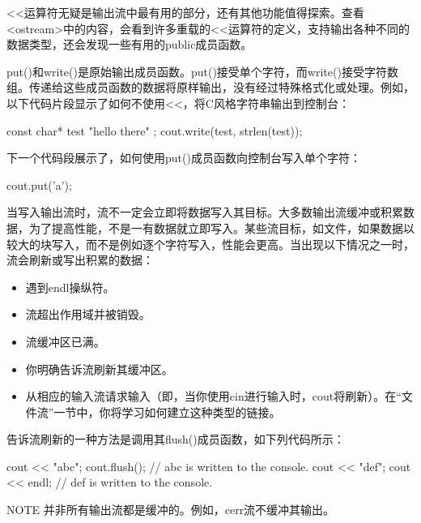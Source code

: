 
<{}<运算符无疑是输出流中最有用的部分，还有其他功能值得探索。查看<ostream>中的内容，会看到许多重载的<{}<运算符的定义，支持输出各种不同的数据类型，还会发现一些有用的public成员函数。


put()和write()是原始输出成员函数。put()接受单个字符，而write()接受字符数组。传递给这些成员函数的数据将原样输出，没有经过特殊格式化或处理。例如，以下代码片段显示了如何不使用<{}<，将C风格字符串输出到控制台：

\begin{cpp}
const char* test { "hello there" };
cout.write(test, strlen(test));
\end{cpp}

下一个代码段展示了，如何使用put()成员函数向控制台写入单个字符：

\begin{cpp}
cout.put('a');
\end{cpp}


当写入输出流时，流不一定会立即将数据写入其目标。大多数输出流缓冲或积累数据，为了提高性能，不是一有数据就立即写入。某些流目标，如文件，如果数据以较大的块写入，而不是例如逐个字符写入，性能会更高。当出现以下情况之一时，流会刷新或写出积累的数据：

\begin{itemize}
\item
遇到endl操纵符。

\item
流超出作用域并被销毁。

\item
流缓冲区已满。

\item
你明确告诉流刷新其缓冲区。

\item
从相应的输入流请求输入（即，当你使用cin进行输入时，cout将刷新）。在“文件流”一节中，你将学习如何建立这种类型的链接。
\end{itemize}

告诉流刷新的一种方法是调用其flush()成员函数，如下列代码所示：

\begin{cpp}
cout << "abc";
cout.flush(); // abc is written to the console.
cout << "def";
cout << endl; // def is written to the console.
\end{cpp}

\begin{myNotic}{NOTE}
并非所有输出流都是缓冲的。例如，cerr流不缓冲其输出。
\end{myNotic}

